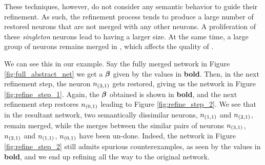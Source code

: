These techniques, however, do not consider any semantic behavior to guide their
refinement. As such, the refinement process tends to produce a large number of
restored neurons that are not merged with any other neurons. A proliferation of
these \emph{singleton} neurons lead to \abs having a larger size. At the same
time, a large group of neurons remains merged in \abs, which affects the quality
of \abs. 

We can see this in our example. Say the fully merged network in Figure
\ref{fig:full_abstract_net} we get a $\boldsymbol{\beta}$ given by the values in \textbf{bold}.
Then, in the next refinement step, the neuron $n_{(3,1)}$ gets restored, giving
us the network in Figure \ref{fig:refine_step_1}. Again, the $\boldsymbol{\beta}$
obtained is shown in \textbf{bold}, and the next refinement step restores $n_{(0,1)}$
leading to Figure \ref{fig:refine_step_2}. We see that in the resultant network,
two semantically dissimilar neurons, $n_{(1,1)}$ and $n_{(2,1)}$, remain merged,
while the merges between the similar pairs of neurons $n_{(3,1)}$, $n_{(2,1)}$
and $n_{(1,1)}$, $n_{(0,1)}$ have been un-done. Indeed, the network in Figure
\ref{fig:refine_step_2} still admits spurious counterexamples, as seen by the
values in \textbf{bold}, and we end up refining all the way to the original
network.



